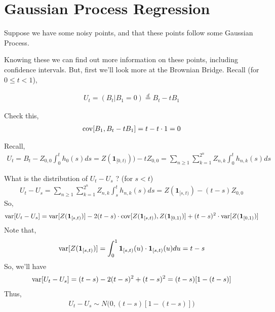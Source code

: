 \documentclass[../../../Master/AppliedStochastics.tex]{subfiles}
\begin{document}
\section{Gaussian Process Regression}
Suppose we have some noisy points, and that these points follow some Gaussian Process. 
\begin{center}
\end{center}
Knowing these we can find out more information on these points, including confidence intervals. 
But, first we'll look more at the Brownian Bridge. 
Recall (for $0\leq t < 1$), 

$$\begin{aligned}
U_{t} = (B_{t}\vert B_{1}=0) \stackrel{d}{=} B_{t} - tB_{1} 
\end{aligned}$$

Check this, 
$$\begin{aligned}
\operatorname{cov}[B_{1}, B_{t}-tB_{1}]= t - t\cdot 1 = 0 
\end{aligned}$$

Recall, 
$$\begin{aligned}
	U_{t}=B_{t}-Z_{0,0}\int_{0}^{t}h_{0}(s)ds=Z(\mathbf{1}_{[0,t)})) - tZ_{0,0} = \sum_{n\geq1}\sum_{k=1}^{2^n}Z_{n,k}\int_{0}^{t} h_{n,k}(s)ds
\end{aligned}$$

What is the distribution of $U_{t}-U_{s}$ ? (for $s<t$)
$$\begin{aligned}
	U_{t}-U_{s} = \sum_{n\geq1}\sum_{k=1}^{2^n} Z_{n,k}\int_{s}^{t} h_{n,k}(s)ds = Z(\mathbf{1}_{[s,t)})-(t-s)Z_{0,0}
\end{aligned}$$
So, 
$$\begin{aligned}
	\operatorname{var}[U_{t}-U_{s}] = \operatorname{var}[Z(\mathbf{1}_{[s,t)})]- 2(t-s)\cdot\operatorname{cov}[Z(\mathbf{1}_{[s,t)}),Z(\mathbf{1}_{[0,1)})] + (t-s)^2 \cdot \operatorname{var}[Z(\mathbf{1}_{[0,1)})]
\end{aligned}$$
Note that, 
$$\begin{aligned}
	\operatorname{var}[Z(\mathbf{1}_{[s,t)})] = \int_{0}^{1} \mathbf{1}_{[s,t)}(u) \cdot \mathbf{1}_{[s,t)}(u) du = t-s 
\end{aligned}$$
So, we'll have 
$$\begin{aligned}
	\operatorname{var}[U_{t}-U_{s}] = (t-s) - 2(t-s)^2 + (t-s)^2 = (t-s)[1-(t-s)]
\end{aligned}$$
Thus, 
$$\begin{aligned}
U_{t}-U_{s} \sim N\Big(0, (t-s)[1-(t-s)]\Big)
\end{aligned}$$











%
\end{document}
